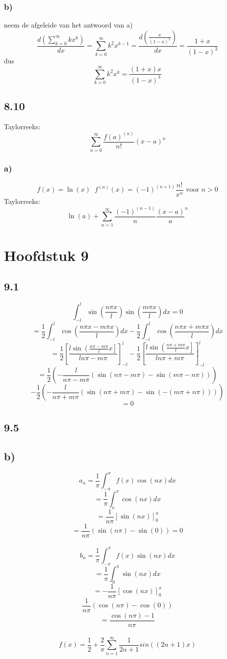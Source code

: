 \documentclass[11pt]{article}
\begin{document}
\subsubsection*{b)}
neem de afgeleide van het antwoord van a)
\[
\frac{d(\sum_{k=0}^\infty kx^{k})}{dx}
=
\sum_{k=0}^\infty k^2x^{k-1}
=
\frac{d(\frac{x}{(1-x)^2})}{dx}
=
\frac{1+x}{(1-x)^3}
\]
dus
\[
\sum_{k=0}^\infty k^2x^{k}
=
\frac{(1+x)x}{(1-x)^3}
\]

\subsection*{8.10}
Taylorreeks:
\[
\sum_{n=0}^\infty\frac{f(a)^{(n)}}{n!}(x-a)^n
\]

\subsubsection*{a)}
\[
f(x) = \ln(x) \;\; f^{(n)}(x) = (-1)^{(n+1)} \frac{n!}{x^n} \text{ voor } n>0
\]
Taylorreeks:
\[
\ln(a) + \sum_{n=1}^\infty\frac{(-1)^{(n-1)}}{n}\frac{(x-a)}{a}^n
\]

\section*{Hoofdstuk 9}
\subsection*{9.1}
\[
\int_{-l}^l\sin\left(\frac{n\pi x}{l}\right)\sin\left(\frac{m\pi x}{l}\right)dx=0
\]
\[
= \frac{1}{2}\int_{-l}^l\cos\left(\frac{n\pi x - m\pi x}{l}\right)dx - \frac{1}{2}\int_{-l}^l\cos\left(\frac{n\pi x + m\pi x}{l}\right)dx
\]
\[
= \frac{1}{2}\left[\frac{l\sin\left(\frac{n\pi-m\pi}{l}x\right]}{ln\pi-m\pi}\right]_{-l}^l
-
\frac{1}{2}\left[\frac{l\sin\left(\frac{n\pi+m\pi}{l}x\right]}{ln\pi+m\pi}\right]_{-l}^l
\]
\[
= \frac{1}{2} \left( -\frac{l}{n\pi - m\pi} \left( \sin(n\pi - m\pi)- \sin(m\pi - n\pi) \right) \right)
\]\[
-\frac{1}{2} \left( -\frac{l}{n\pi + m\pi} \left( \sin(n\pi + m\pi)- \sin(-(m\pi + n\pi)) \right) \right)
\]
\[
=0
\]

\subsection*{9.5}
\subsection*{b)}
\[
a_n = \frac{1}{\pi}\int_{-\pi}^\pi f(x)\cos(nx)dx
\]
\[
= \frac{1}{\pi} \int_o^\pi \cos(nx)dx
\]
\[
=\frac{1}{n\pi}\left[\sin(nx)\right]_0^\pi
\]
\[
= \frac{1}{n\pi}(\sin(n\pi)-\sin(0)) = 0
\]\\
\[
b_n = \frac{1}{\pi}\int_{-\pi}^\pi f(x)\sin(nx)dx
\]
\[
= \frac{1}{\pi} \int_0^\pi \sin(nx)dx
\]
\[
= -\frac{1}{n\pi} \left[ \cos(nx) \right]_0^\pi
\]
\[
\frac{1}{n\pi}(\cos(n\pi)-\cos(0))
\]
\[
= \frac{\cos(n\pi)-1}{n\pi}
\]\\
\[
f(x)  = \frac{1}{2} + \frac{2}{\pi} \sum_{n=1}^\infty \frac{1}{2n+1}sin((2n+1)x)
\]
\end{document}
